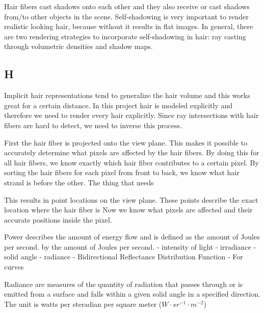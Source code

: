 \documentclass[11pt,a4paper]{report}
\begin{document}
Hair fibers cast shadows onto each other and they also receive or cast shadows from/to other objects in the scene. Self-shadowing is very important to render realistic looking hair, because without it results in flat images. In general, there are two rendering strategies to incorporate self-shadowing in hair: ray casting through volumetric densities and shadow maps.

\subsection{H}

Implicit hair representations tend to generalize the hair volume and this works great for a certain distance. In this project hair is modeled explicitly and therefore we need to render every hair explicitly. Since ray intersections with hair fibers are hard to detect, we need to inverse this process.

First the hair fiber is projected onto the view plane. This makes it possible to accurately determine what pixels are affected by the hair fibers. By doing this for all hair fibers, we know exactly which hair fiber contributes to a certain pixel. By sorting the hair fibers for each pixel from front to back, we know what hair strand is before the other. The thing that needs 

This results in point locations on the view plane. These points describe the exact location where the hair fiber is  Now we know what pixels are affected and their accurate positions inside the pixel.







Power describes the amount of energy flow and is defined as the amount of Joules per second.  by the amount of Joules per second. 
- intensity of light
- irradiance
- solid angle
- radiance
- Bidirectional Reflectance Distribution Function
- For curves

Radiance are measures of the quantity of radiation that passes through or is emitted from a surface and falls within a given solid angle in a specified direction. The unit is watts per steradian per square meter ($W \cdot sr^{-1} \cdot m^{-2}$) 
\end{document}
